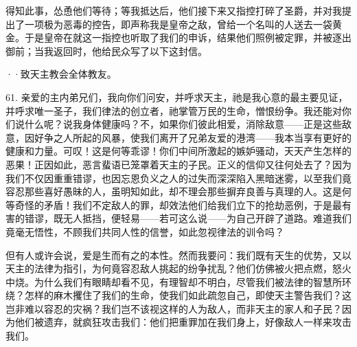 得知此事，怂恿他们等待；等我抵达后，他们接下来又指控打碎了圣爵，并对我提出了一项极为恶毒的控告，即声称我是皇帝之敌，曾给一个名叫的人送去一袋黄金。于是皇帝在就这一指控也听取了我们的申诉，结果他们照例被定罪，并被逐出御前；当我返回时，他给民众写了以下这封信。\par

··致天主教会全体教友。\par

61. 亲爱的主内弟兄们，我向你们问安，并呼求天主，祂是我心意的最主要见证，并呼求唯一圣子，我们律法的创立者，祂掌管万民的生命，憎恨纷争。我还能对你们说什么呢？说我身体健康吗？不，如果你们彼此相爱，消除敌意——正是这些敌意，因好争之人所起的风暴，使我们离开了兄弟友爱的港湾——我本当享有更好的健康和力量。可叹！这是何等乖谬！你们中间所激起的嫉妒骚动，天天产生怎样的恶果！正因如此，恶言蜚语已笼罩着天主的子民。正义的信仰又往何处去了？因为我们不仅因重重错谬，也因忘恩负义之人的过失而深深陷入黑暗迷雾，以至我们竟容忍那些喜好愚昧的人，虽明知如此，却不理会那些摒弃良善与真理的人。这是何等奇怪的矛盾！我们不定敌人的罪，却效法他们给我们立下的抢劫恶例，于是最有害的错谬，既无人抵挡，便轻易——若可这么说——为自己开辟了道路。难道我们竟毫无悟性，不顾我们共同人性的信誉，如此忽视律法的训令吗？\par

但有人或许会说，爱是生而有之的本性。然而我要问：我们既有天生的优势，又以天主的法律为指引，为何竟容忍敌人挑起的纷争扰乱？他们仿佛被火把点燃，怒火中烧。为什么我们有眼睛却看不见，有理智却不明白，尽管我们被法律的智慧所环绕？怎样的麻木攫住了我们的生命，使我们如此疏忽自己，即使天主警告我们？这岂非难以容忍的灾祸？我们岂不该视这样的人为敌人，而非天主的家人和子民？因为他们被遗弃，就疯狂攻击我们：他们把重罪加在我们身上，好像敌人一样来攻击我们。\par

